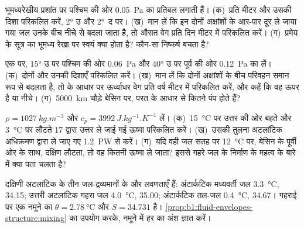 \begin{exercise}[$\star\star$]\label{exo:b1:ocean-circulation:6}
भूमध्यरेखीय प्रशांत पर  पश्चिम की ओर \qty{0.05}{Pa} का प्रतिबल लगाती हैं।
(क)~प्रति मीटर  और उसकी दिशा परिकलित करें, \ang{2} उ और \ang{2}~द पर। (ख)~मान लें कि इन दोनों अक्षांशों के आर-पार दूर ले जाया गया जल उनके बीच नीचे से बदला जाता है, तो औसत  वेग प्रति दिन मीटर में परिकलित करें। (ग)~प्रमेय के सूत्र का भूमध्य रेखा पर स्वयं क्या होता है? कौन-सा निष्कर्ष बचता है?
\end{exercise}

\begin{exercise}[$\star\star$]\label{exo:b1:ocean-circulation:7}
एक  पर, \ang{15} उ पर पश्चिम की ओर \qty{0.06}{Pa} और \ang{40} उ पर पूर्व की ओर \qty{0.12}{Pa} का  लें। (क)~दोनों  और उनकी दिशाएँ परिकलित करें। (ख)~मान लें कि दोनों अक्षांशों के बीच परिवहन समान रूप से बदलता है, तो  के आधार पर ऊर्ध्वाधर वेग प्रति वर्ष मीटर में परिकलित करें, और कहें कि वह ऊपर है या नीचे। (ग)~\qty{5000}{km} चौड़े बेसिन पर, परत के आधार से कितने  पंप होते हैं?
\end{exercise}

\begin{exercise}[$\star\star$]\label{exo:b1:ocean-circulation:8}
$\rho = \qty{1027}{kg.m^{-3}}$ और $c_p = \qty{3992}{J.kg^{-1}.K^{-1}}$ लें।
(क)~\qty{15}{\celsius} पर उत्तर की ओर बहते और \qty{3}{\celsius} पर लौटते \qty{17}{\sverdrup} द्वारा उत्तर ले जाई गई ऊष्मा परिकलित करें। (ख)~उसकी तुलना अटलांटिक अधिक्रमण द्वारा ले जाए गए \qty{1.2}{PW} से करें। (ग)~यदि वही जल सतह पर \qty{12}{\celsius} पर, बेसिन के पूर्वी ओर के साथ, दक्षिण लौटता, तो वह कितनी ऊष्मा ले जाता? इससे गहरे जल के निर्माण के महत्व के बारे में क्या पता चलता है?
\end{exercise}

\begin{exercise}[$\star\star$]\label{exo:b1:ocean-circulation:9}
दक्षिणी अटलांटिक के तीन जल-द्रव्यमानों के  और लवणताएँ हैं: अंटार्कटिक मध्यवर्ती जल \qty{3.3}{\celsius}, 34.15; उत्तरी अटलांटिक गहरा जल \qty{4.0}{\celsius}, 35.00; अंटार्कटिक तल-जल \qty{0.4}{\celsius},
34.67। गहराई पर एक नमूने का $\theta = \qty{2.78}{\celsius}$ और $S = 34.731$ है। \cref{prop:b1:fluid-envelopes-structure:mixing} का उपयोग करके, नमूने में हर  का अंश ज्ञात करें।
\end{exercise}

